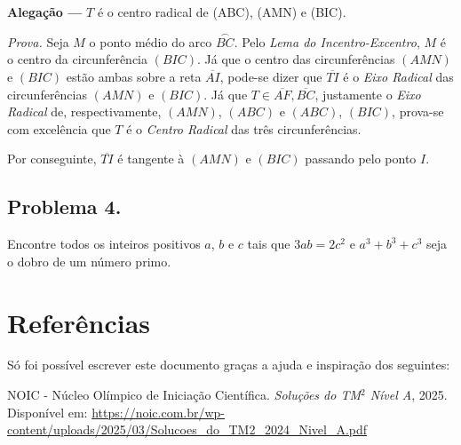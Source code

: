 \documentclass[12pt]{article}
\begin{document}
      \begin{tcolorbox}[claimbox={Claim}]
        \textbf{\sffamily\textcolor{color1}{Alegação ---}} $T$ é o centro 
        radical de (ABC), (AMN) e (BIC).
      \end{tcolorbox}

      \textit{Prova.} Seja $M$ o ponto médio do arco $\overset{\frown}{BC}$. Pelo
      \textit{Lema do Incentro-Excentro}, $M$ é o centro da circunferência $(BIC)$. Já que
      o centro das circunferências $(AMN)$ e $(BIC)$ estão ambas sobre a reta $\overline{AI}$,
      pode-se dizer que $\overline{TI}$ é o \textit{Eixo Radical} das circunferências $(AMN)$
      e $(BIC)$. Já que $T \in \overline{AF}, \overline{BC}$, justamente o \textit{Eixo
      Radical} de, respectivamente, $(AMN)$, $(ABC)$ e $(ABC)$, $(BIC)$, prova-se com excelência
      que $T$ é o \textit{Centro Radical} das três circunferências.

      Por conseguinte, $\overline{TI}$ é tangente à $(AMN)$ e $(BIC)$ passando pelo ponto $I$.
    \clearpage
    
    \subsection{Problema 4.}
      \begin{tcolorbox}[problembox={Enunciado do problema}]
        Encontre todos os inteiros positivos $a$, $b$ e $c$ tais que $3ab = 2c^2$
        e $ a^3 + b^3 + c^3$ seja o dobro de um número primo.
      \end{tcolorbox}

  \clearpage
  
  \section{\textsf{Referências}}
  Só foi possível escrever este documento graças a ajuda e inspiração dos seguintes:

  \renewcommand{\refname}{\vspace{-2em}}
  \begin{thebibliography}{9}
    NOIC - Núcleo Olímpico de Iniciação Científica.
    \textit{Soluções do TM$^2$ Nível A}, 2025.
    Disponível em: \url{https://noic.com.br/wp-content/uploads/2025/03/Solucoes_do_TM2_2024_Nivel_A.pdf}
  \end{thebibliography}
\end{document}
